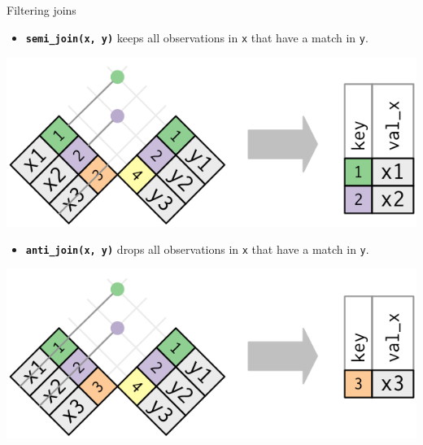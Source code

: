 \documentclass[14pt,ignorenonframetext,]{bredelebeamer}
\providecommand{\tightlist}{%
  \setlength{\itemsep}{0pt}\setlength{\parskip}{0pt}}
\begin{document}
\begin{frame}[fragile]{Filtering joins}

\begin{itemize}
\tightlist
\item
  \textbf{\texttt{semi\_join(x,\ y)}} keeps all observations in
  \texttt{x} that have a match in \texttt{y}.
\end{itemize}

\begin{center}\includegraphics[width=0.4\linewidth]{images/join-semi} \end{center}

\begin{itemize}
\tightlist
\item
  \textbf{\texttt{anti\_join(x,\ y)}} drops all observations in
  \texttt{x} that have a match in \texttt{y}.
\end{itemize}

\begin{center}\includegraphics[width=0.4\linewidth]{images/join-anti} \end{center}

\end{frame}
\end{document}
